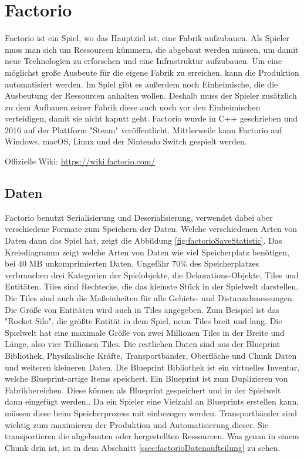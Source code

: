 \section{Factorio}
Factorio ist ein Spiel, wo das Hauptziel ist, eine Fabrik aufzubauen. Als Spieler muss man sich um Ressourcen kümmern, die abgebaut werden müssen, um damit neue Technologien zu erforschen und eine Infrastruktur aufzubauen. Um eine möglichst große Ausbeute für die eigene Fabrik zu erreichen, kann die Produktion automatisiert werden. Im Spiel gibt es außerdem noch Einheimische, die die Ausbeutung der Ressourcen anhalten wollen. Deshalb muss der Spieler zusätzlich zu dem Aufbauen seiner Fabrik diese auch noch vor den Einheimischen verteidigen, damit sie nicht kaputt geht. Factorio wurde in C++ geschrieben und 2016 auf der Plattform "Steam" veröffentlicht. Mittlerweile kann Factorio auf Windows, macOS, Linux und der Nintendo Switch gespielt werden.\cite{factorioMain}\cite{factorioPressFactorio}


Offizielle Wiki: \url{https://wiki.factorio.com/}\cite{factorioPressFactorio}

\subsection{Daten}
Factorio benutzt Serialisierung und Deserialisierung, verwendet dabei aber verschiedene Formate zum Speichern der Daten. Welche verschiedenen Arten von Daten dann das Spiel hat, zeigt die Abbildung \ref{fig:factorioSaveStatistic}. Das Kreisdiagramm zeigt welche Arten von Daten wie viel Speicherplatz benötigen, bei 40 MB unkomprimierten Daten. Ungefähr 70\% des Speicherplatzes verbrauchen drei Kategorien der Spielobjekte, die Dekorations-Objekte, Tiles und Entitäten. Tiles sind Rechtecke, die das kleinste Stück in der Spielwelt darstellen. Die Tiles sind auch die Maßeinheiten für alle Gebiets- und Distanzabmessungen. Die Größe von Entitäten wird auch in Tiles angegeben. Zum Beispiel ist das "Rocket Silo", die größte Entität in dem Spiel, neun Tiles breit und lang. Die Spielwelt hat eine maximale Größe von zwei Millionen Tiles in der Breite und Länge, also vier Trillionen Tiles.\cite{factorioMapStructure} Die restlichen Daten sind aus der Blueprint Bibliothek, Physikalische Kräfte, Transportbänder, Oberfläche und Chunk Daten und weiteren kleineren Daten.\cite{factorioFridayFacts270} Die Blueprint Bibliothek ist ein virtuelles Inventar, welche Blueprint-artige Items speichert.\cite{factorioBlueprintLibrary} Ein Blueprint ist zum Duplizieren von Fabrikbereichen. Diese können als Blueprint gespeichert und in der Spielwelt dann eingefügt werden.\cite{factorioBlueprint}. Da ein Spieler eine Vielzahl an Blueprints erstellen kann, müssen diese beim Speicherprozess mit einbezogen werden. Transportbänder sind wichtig zum maximieren der Produktion und Automatisierung dieser. Sie transportieren die abgebauten oder hergestellten Ressourcen. Was genau in einem Chunk drin ist, ist in dem Abschnitt \ref{ssec:factorioDatenaufteilung} zu sehen. 

